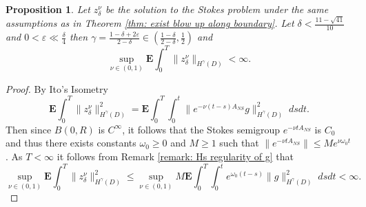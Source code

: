 \documentclass[11pt, reqno]{article}
\def\R{{\mathbb R}} %
\def\red{\textcolor{red}}
\newtheorem{lemma}[theorem]{Lemma}
\newtheorem{proposition}[theorem]{Proposition}
\newcommand{\ethan}[1]{\red{Ethan: #1}} %
\def\E{\mathbf{E}}
\def\P{{\mathbb P}}
\begin{document}
\begin{proposition}\label{proposition: z Hgamma regularity}
    Let $z_\delta^\nu$ be the solution to the Stokes problem under the same assumptions as in Theorem \ref{thm: exist blow up along boundary}. Let $\delta < \frac{11-\sqrt{41}}{10}$ and $0 < \varepsilon \ll \frac{\delta}{4}$ then $\gamma = \frac{1-\delta + 2\varepsilon}{2-\delta} \in (\frac{1-\delta}{2-\delta}, \frac{1}{2})$ and
    \[
        \sup_{\nu \in (0, 1)} \E\int_0^T\|z_\delta^\nu\|_{H^\gamma(D)} < \infty.
    \]
\end{proposition}
\begin{proof}
    By Ito's Isometry
    \[
        \E\int_0^T\|z_\delta^\nu\|_{H^\gamma(D)}^2 = \E\int_0^T \int_0^t\|e^{-\nu(t-s)A_{NS}}g\|_{H^\gamma(D)}^2\;dsdt.
    \]
    Then since $B(0,R)$ is $C^\infty$, it follows that the Stokes semigroup $e^{-\nu tA_{NS}}$ is $C_0$ \cite{ter2020holder} and thus there exists constants $\omega_0 \geq 0$ and $M \geq 1$ such that $\|e^{-\nu tA_{NS}}\| \leq Me^{\nu \omega_0 t}$. As $T < \infty$  
    it follows from Remark \ref{remark: Hs regularity of g} that 
    \[
        \sup_{\nu \in (0,1)} \E\int_0^T\|z_\delta^\nu\|_{H^\gamma(D)}^2 \leq \sup_{\nu \in (0,1)}M\E\int_0^T \int_0^t e^{\omega_0(t-s)}\|g\|_{H^\gamma(D)}^2\;dsdt < \infty.
    \]
\end{proof}
\end{document}
